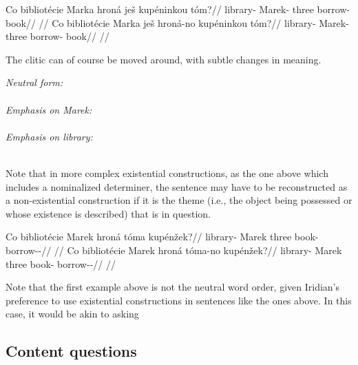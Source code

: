 \pex
\a
\begingl
\gla Co bibliotécie Marka hroná ješ kupéninkou tóm?//
\glb {} library-\Gen{} Marek-\Pat{} three \Exst{} borrow- book//
\glft {}//
\endgl
\a
\begingl
\gla Co bibliotécie Marka ješ hroná-no kupéninkou tóm?//
\glb {} library-\Gen{} Marek-\Pat{} \Exst{} three borrow- book//
\glft {}//
\endgl
\xe

The clitic  can of course be moved around, with subtle changes in meaning.

\pex
\a \emph{Neutral form:}\\
\\
\a \emph{Emphasis on \emph{Marek:}}\\
\\
\a \emph{Emphasis on \emph{library:}}\\
\\
\xe

Note that in more complex existential constructions, as the one above which includes a nominalized determiner, the sentence may have to be reconstructed as a non-existential construction if it is the theme (i.e., the object being possessed or whose existence is described) that is in question.

\pex
\a
\begingl
\gla Co bibliotécie Marek hroná tóma kupénžek?//
\glb {} library-\Gen{} Marek three book-\Pat{} borrow-\Av{}-\Pf{}//
\glft {}//
\endgl
\a
\begingl
\gla Co bibliotécie Marek hroná tóma-no kupénžek?//
\glb {} library-\Gen{} Marek three book- borrow-\Av{}-\Pf{}//
\glft {}//
\endgl
\xe

Note that the first example above is not the neutral word order, given Iridian's preference to use existential constructions in sentences like the ones above. In this case, it would be akin to asking 


\subsection{Content questions}

